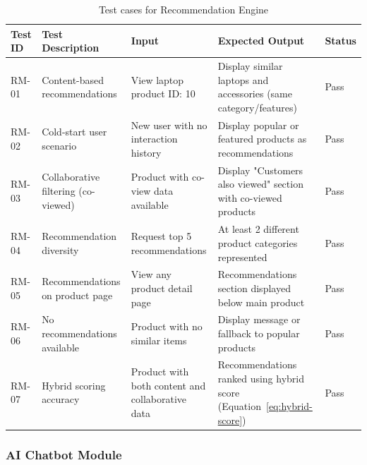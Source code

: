 \begin{table}[H]
\centering
\caption{Test cases for Recommendation Engine}
\label{tab:test-recommendations}
\small
\begin{tabular}{|p{1.3cm}|p{3.5cm}|p{3cm}|p{3.5cm}|p{1.2cm}|}
\hline
\textbf{Test ID} & \textbf{Test Description} & \textbf{Input} & \textbf{Expected Output} & \textbf{Status} \\
\hline
RM-01 & Content-based recommendations & View laptop product ID: 10 & Display similar laptops and accessories (same category/features) & Pass \\
\hline
RM-02 & Cold-start user scenario & New user with no interaction history & Display popular or featured products as recommendations & Pass \\
\hline
RM-03 & Collaborative filtering (co-viewed) & Product with co-view data available & Display "Customers also viewed" section with co-viewed products & Pass \\
\hline
RM-04 & Recommendation diversity & Request top 5 recommendations & At least 2 different product categories represented & Pass \\
\hline
RM-05 & Recommendations on product page & View any product detail page & Recommendations section displayed below main product & Pass \\
\hline
RM-06 & No recommendations available & Product with no similar items & Display message or fallback to popular products & Pass \\
\hline
RM-07 & Hybrid scoring accuracy & Product with both content and collaborative data & Recommendations ranked using hybrid score (Equation~\ref{eq:hybrid-score}) & Pass \\
\hline
\end{tabular}
\end{table}

\subsubsection*{AI Chatbot Module}

